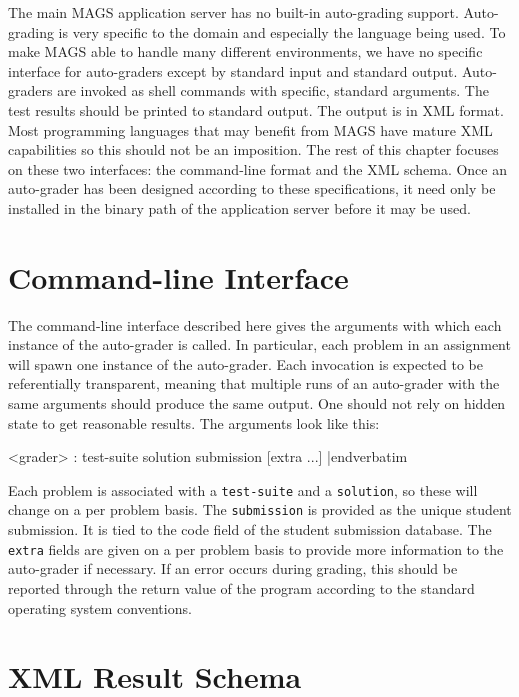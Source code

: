 The main MAGS application server has no built-in auto-grading support. 
Auto-grading is very specific to the domain and especially the language
being used. To make MAGS able to handle many different environments, 
we have no specific interface for auto-graders except by standard input and 
standard output. Auto-graders are invoked as shell commands with specific, 
standard arguments. The test results should be printed to standard output. The 
output is in XML format. Most programming languages that may benefit from MAGS
have mature XML capabilities so this should not be an imposition. The rest of 
this chapter focuses on these two interfaces: the command-line format and 
the XML schema. Once an auto-grader has been designed according to these 
specifications, it need only be installed in the binary path of the application
server before it may be used.

\section{Command-line Interface}

\noindent
The command-line interface described here gives the arguments with which each 
instance of the auto-grader is called. In particular, each problem in an 
assignment will spawn one instance of the auto-grader. Each invocation is 
expected to be referentially transparent, meaning that multiple runs of an 
auto-grader with the same arguments should produce the same output. One should 
not rely on hidden state to get reasonable results. The arguments look
like this:

\medskip\verbatim
<grader> : test-suite solution submission [extra ...]
|endverbatim\medskip

\noindent
Each problem is associated with a {\tt test-suite} and a {\tt solution}, so 
these will change on a per problem basis. The {\tt submission} is provided 
as the unique student submission. It is tied to the code field of the student
submission database. The {\tt extra} fields are given on a per problem basis
to provide more information to the auto-grader if necessary. If an error 
occurs during grading, this should be reported through the return value of 
the program according to the standard operating system conventions.

\section{XML Result Schema}


